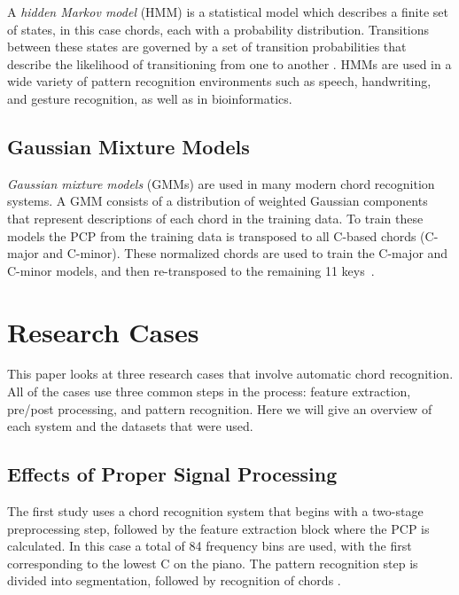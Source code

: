 \documentclass{sig-alternate}
\begin{document}
A \textit{hidden Markov model} (HMM) is a statistical model which describes a finite set of states, in this case chords, each with a probability distribution. Transitions between these states are governed by a set of transition probabilities that describe the likelihood of transitioning from one to another \cite{TaeMin:2014}. HMMs are used in a wide variety of pattern recognition environments such as speech, handwriting, and gesture recognition, as well as in bioinformatics. 


\subsection{Gaussian Mixture Models}

\textit{Gaussian mixture models} (GMMs) are used in many modern chord recognition systems. A GMM consists of a distribution of weighted Gaussian components that represent descriptions of each chord in the training data. To train these models the PCP from the training data is transposed to all C-based chords (C-major and C-minor). These normalized chords are used to train the C-major and C-minor models, and then re-transposed to the remaining 11 keys~\cite{TaeMin:2014}.


\section{Research Cases}

This paper looks at three research cases that involve automatic chord recognition. All of the cases use three common steps in the process: feature extraction, pre/post processing, and pattern recognition. Here we will give an overview of each system and the datasets that were used.

\subsection{Effects of Proper Signal Processing}

The first study \cite{Morman:2006} uses a chord recognition system that begins with a two-stage preprocessing step, followed by the feature extraction block where the PCP is calculated. In this case a total of 84 frequency bins are used, with the first corresponding to the lowest C on the piano. The pattern recognition step is divided into segmentation, followed by recognition of chords \cite{Morman:2006}.
\end{document}
